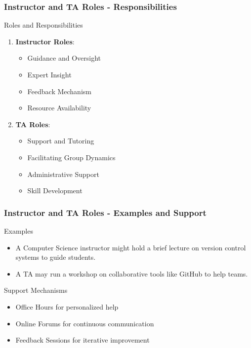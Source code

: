 \documentclass[aspectratio=169]{beamer}
\begin{document}
\begin{frame}[fragile]
    \frametitle{Instructor and TA Roles - Responsibilities}
    \begin{block}{Roles and Responsibilities}
        \begin{enumerate}
            \item \textbf{Instructor Roles}:
            \begin{itemize}
                \item Guidance and Oversight
                \item Expert Insight
                \item Feedback Mechanism
                \item Resource Availability
            \end{itemize}

            \item \textbf{TA Roles}:
            \begin{itemize}
                \item Support and Tutoring
                \item Facilitating Group Dynamics
                \item Administrative Support
                \item Skill Development
            \end{itemize}
        \end{enumerate}
    \end{block}
\end{frame}

\begin{frame}[fragile]
    \frametitle{Instructor and TA Roles - Examples and Support}
    \begin{block}{Examples}
        \begin{itemize}
            \item A Computer Science instructor might hold a brief lecture on version control systems to guide students.
            \item A TA may run a workshop on collaborative tools like GitHub to help teams.
        \end{itemize}
    \end{block}

    \begin{block}{Support Mechanisms}
        \begin{itemize}
            \item Office Hours for personalized help
            \item Online Forums for continuous communication
            \item Feedback Sessions for iterative improvement
        \end{itemize}
    \end{block}
\end{frame}
\end{document}
